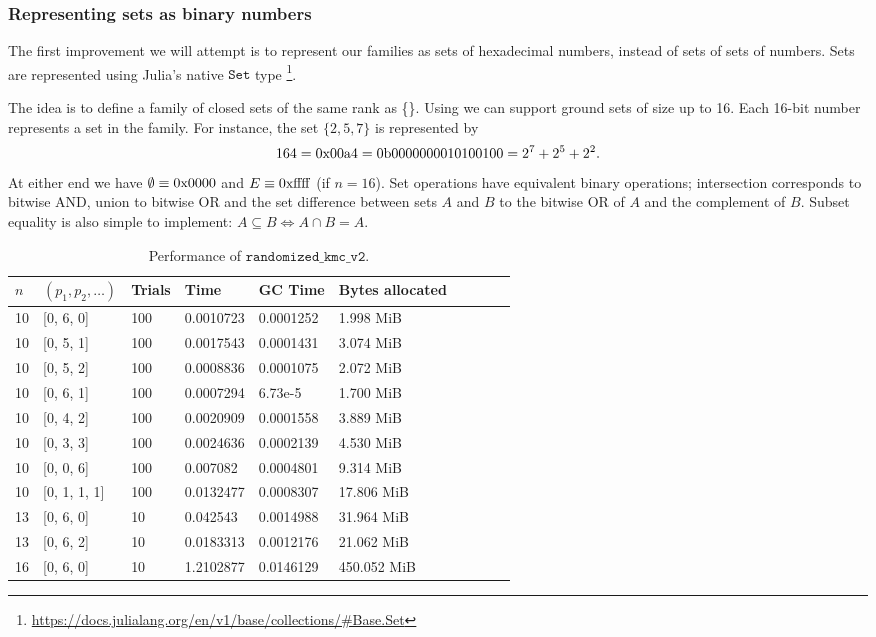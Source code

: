 \subsubsection{Representing sets as binary numbers}
The first improvement we will attempt is to represent our families as sets of hexadecimal numbers, instead of sets of sets of numbers. Sets are represented using Julia's native $\texttt{Set}$ type \footnote{\href{https://docs.julialang.org/en/v1/base/collections/\#Base.Set}{https://docs.julialang.org/en/v1/base/collections/\#Base.Set}}. 

The idea is to define a family of closed sets of the same rank as \{\}. Using  we can support ground sets of size up to 16. Each 16-bit number represents a set in the family. For instance, the set $\{ 2,5,7 \}$ is represented by $$164 = 0\rm{x}00\rm{a}4 = 0\rm{b}0000000010100100 = 2^7+2^5+2^2.$$ At either end we have $\emptyset \equiv 0\rm{x}0000$ and $E \equiv 0\rm{xffff}$ (if $n = 16$). Set operations have equivalent binary operations; intersection corresponds to bitwise AND, union to bitwise OR and the set difference between sets $A$ and $B$ to the bitwise OR of $A$ and the complement of $B$. Subset equality is also simple to implement: $A \subseteq B \iff A \cap B = A.$ 

\begin{table*}[ht!]
  \centering
  \caption{Performance of $\texttt{randomized\_kmc\_v2}$.}
  \label{tab:perf_v2}
  \begin{threeparttable}
    \begin{tabular}{llllllllll}
      \toprule
      $n$ & $(p_1, p_2, \ldots)$ & Trials & Time  & GC Time & Bytes allocated \\
      \midrule
      10 & [0, 6, 0] & 100 & 0.0010723 & 0.0001252 & 1.998 MiB \\ 
      10 & [0, 5, 1] & 100 & 0.0017543 & 0.0001431 & 3.074 MiB \\ 
      10 & [0, 5, 2] & 100 & 0.0008836 & 0.0001075 & 2.072 MiB \\ 
      10 & [0, 6, 1] & 100 & 0.0007294 & 6.73e-5 & 1.700 MiB \\ 
      10 & [0, 4, 2] & 100 & 0.0020909 & 0.0001558 & 3.889 MiB \\ 
      10 & [0, 3, 3] & 100 & 0.0024636 & 0.0002139 & 4.530 MiB \\ 
      10 & [0, 0, 6] & 100 & 0.007082 & 0.0004801 & 9.314 MiB \\ 
      10 & [0, 1, 1, 1] & 100 & 0.0132477 & 0.0008307 & 17.806 MiB \\ 
      13 & [0, 6, 0] & 10 & 0.042543 & 0.0014988 & 31.964 MiB \\ 
      13 & [0, 6, 2] & 10 & 0.0183313 & 0.0012176 & 21.062 MiB \\ 
      16 & [0, 6, 0] & 10 & 1.2102877 & 0.0146129 & 450.052 MiB \\ 
      \bottomrule
    \end{tabular}
  \end{threeparttable}
\end{table*}

